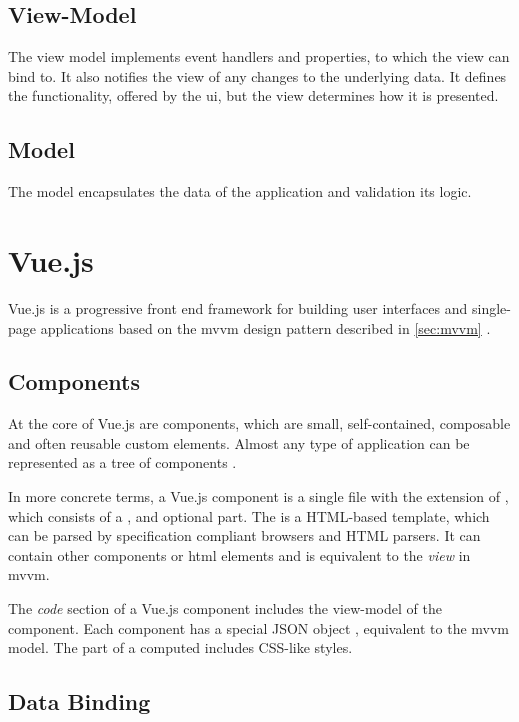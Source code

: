 \subsection{View-Model}
The view model implements event handlers and properties, to which the view can bind to. It also notifies the view of any changes to the underlying data. It defines the functionality, offered by the \gls{ui}, but the view determines how it is presented. 
\subsection{Model}
The model encapsulates the data of the application and validation its logic.


\section{Vue.js}

Vue.js \parencite{vuejs_gh} is a progressive front end framework for building user interfaces and single-page applications based on the \gls{mvvm} design pattern described in \ref{sec:mvvm} \parencite{vuejs_book} \parencite{vuejs_guide}.  

\subsection{Components}
At the core of Vue.js are components, which are small, self-contained, composable and often reusable custom elements. Almost any type of application can be represented as a tree of components \parencite{vuejs_guide}. 

In more concrete terms, a Vue.js component is a single file with the extension of , which consists of a ,  and optional  part. The  is a HTML-based template, which can be parsed by specification compliant browsers and HTML parsers. It can contain other components or html elements and is equivalent to the \textit{view} in \gls{mvvm}. 

The \textit{code} section of a Vue.js component includes the view-model of the component. Each component has a special JSON object , equivalent to the \gls{mvvm} model.
The  part of a computed includes CSS-like styles.

\subsection{Data Binding}

